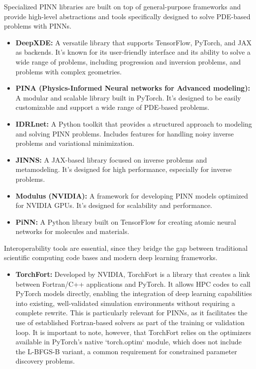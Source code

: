 \documentclass[12pt,fleqn]{article}
\begin{document}
Specialized PINN libraries are built on top of general-purpose frameworks and provide high-level abstractions and tools specifically designed to solve PDE-based problems with PINNs.

\begin{itemize}
\item \textbf{DeepXDE:} A versatile library that supports TensorFlow, PyTorch, and JAX as backends. It's known for its user-friendly interface and its ability to solve a wide range of problems, including progression and inversion problems, and problems with complex geometries.
\item \textbf{PINA (Physics-Informed Neural networks for Advanced modeling):} A modular and scalable library built in PyTorch. It's designed to be easily customizable and support a wide range of PDE-based problems.
\item \textbf{IDRLnet:} A Python toolkit that provides a structured approach to modeling and solving PINN problems. Includes features for handling noisy inverse problems and variational minimization.
\item \textbf{JINNS:} A JAX-based library focused on inverse problems and metamodeling. It's designed for high performance, especially for inverse problems.
\item \textbf{Modulus (NVIDIA):} A framework for developing PINN models optimized for NVIDIA GPUs. It's designed for scalability and performance.
\item \textbf{PiNN:} A Python library built on TensorFlow for creating atomic neural networks for molecules and materials.

\end{itemize}

Interoperability tools are essential, since they bridge the gap between traditional scientific computing code bases and modern deep learning frameworks.  

\begin{itemize}
    \item \textbf{TorchFort:} Developed by NVIDIA, TorchFort \citep{torchfort2021} is a library that creates a link between Fortran/C++ applications and PyTorch. It allows HPC codes to call PyTorch models directly, enabling the integration of deep learning capabilities into existing, well-validated simulation environments without requiring a complete rewrite. This is particularly relevant for PINNs, as it facilitates the use of established Fortran-based solvers as part of the training or validation loop. It is important to note, however, that TorchFort relies on the optimizers available in PyTorch's native `torch.optim` module, which does not include the L-BFGS-B variant, a common requirement for constrained parameter discovery problems.
\end{itemize}
\end{document}
